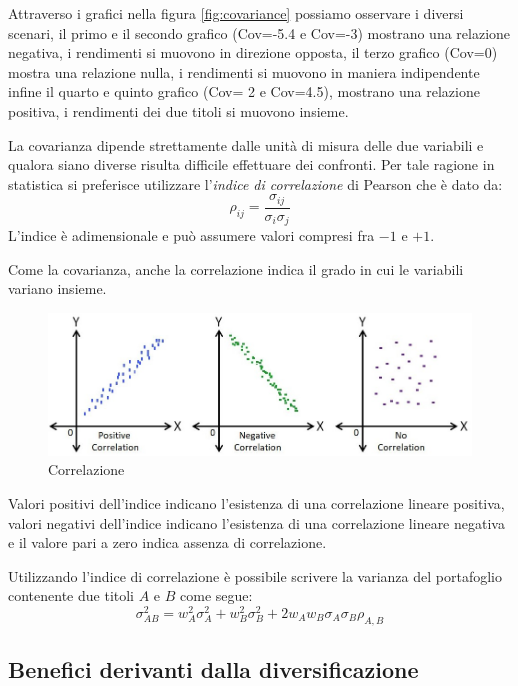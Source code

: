 Attraverso i grafici nella figura \ref{fig:covariance} possiamo osservare i diversi scenari, il primo e il secondo grafico (Cov=-5.4 e Cov=-3) mostrano una relazione negativa, i rendimenti si muovono in direzione opposta, il terzo grafico (Cov=0) mostra una relazione nulla, i rendimenti si muovono in maniera indipendente infine il quarto e quinto grafico (Cov= 2 e Cov=4.5), mostrano una relazione positiva, i rendimenti dei due titoli si muovono insieme.  

La covarianza dipende strettamente dalle unità di misura delle due variabili e qualora siano diverse risulta difficile effettuare dei confronti. Per tale ragione in statistica si preferisce utilizzare l'\textit{indice di correlazione} di Pearson che è dato da:
\begin{equation}
\rho_{ij}=\dfrac{\sigma_{ij}}{\sigma_{i}\sigma_{j}}
\end{equation}
L'indice è adimensionale e può assumere valori compresi fra $-1$ e $+1$. 

Come la covarianza, anche la correlazione indica il grado in cui le variabili variano insieme.
\begin{figure}[h!]
	\centering
	\includegraphics[width=0.7\linewidth]{"imgs/correlation 1 (2)"}
	\caption{Correlazione \cite{noauthor_scatter_nodate}}
	\label{fig:correlation-1-2}
\end{figure}


Valori positivi dell'indice indicano l'esistenza di una correlazione lineare positiva, valori negativi dell'indice indicano l'esistenza di una correlazione lineare negativa e il valore pari a zero indica assenza di correlazione.
 
Utilizzando l'indice di correlazione è possibile scrivere la varianza del portafoglio contenente due titoli $A$ e $B$ come segue: 
\begin{equation}
\label{key}
\sigma^{2}_{AB} = w_{A}^2\sigma^{2}_A+w_{B}^2\sigma^{2}_B + 2 w_{A} w_{B} \sigma_A \sigma_B \rho_{A,B}
\nonumber
\end{equation}

\subsection{Benefici derivanti dalla diversificazione}

